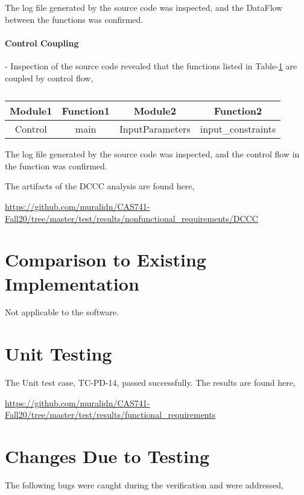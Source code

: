 \documentclass[12pt, titlepage]{article}
\begin{document}
The log file generated by the source code was inspected, and the DataFlow between the 
functions was confirmed.

\paragraph{Control Coupling} - Inspection of the source code revealed that the functions listed in Table-\ref{tab:ctrlCoupling}  
are coupled by control flow,

\begin{table}[]
\caption{}
\label{tab:ctrlCoupling}
\begin{tabular}{c|c|c|c}
\multicolumn{1}{c|}{Module1} & \multicolumn{1}{c|}{Function1} & Module2         & Function2     \\ \hline
Control                      & main                           & InputParameters & input\_constraints    \\
\end{tabular}
\end{table}

The log file generated by the source code was inspected, and the control flow in the 
function was confirmed.

The artifacts of the DCCC analysis are found here,

 \url{https://github.com/muralidn/CAS741-Fall20/tree/master/test/results/nonfunctional_requirements/DCCC}
	
\section{Comparison to Existing Implementation}	

Not applicable to the \progname{} software.

\section{Unit Testing}

The Unit test case, TC-PD-14, passed successfully. The results are found here,

  \url{https://github.com/muralidn/CAS741-Fall20/tree/master/test/results/functional_requirements}

\section{Changes Due to Testing}

The following bugs were caught during the verification and were addressed,
\end{document}
